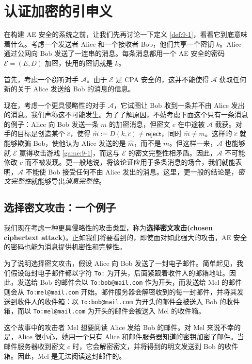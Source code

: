 \section{认证加密的引申义}\label{sec:9-2}

在构建 AE 安全的系统之前，让我们先再讨论一下定义 \ref{def:9-1}，看看它到底意味着什么。考虑一个发送者 Alice 和一个接收者 Bob，他们共享一个密钥 $k$。Alice 通过公网向 Bob 发送了一连串的消息。每条消息都用一个 AE 安全的密码 $\mathcal{E}=(E,D)$ 加密，使用的密钥就是 $k$。

首先，考虑一个窃听对手 $\mathcal{A}$。由于 $\mathcal{E}$ 是 CPA 安全的，这并不能使得 $\mathcal{A}$ 获取任何新的关于 Alice 发送给 Bob 的消息的信息。

现在，考虑一个更具侵略性的对手 $\mathcal{A}$，它试图让 Bob 收到一条并不由 Alice 发出的消息。我们声称这不可能发生。为了了解原因，不妨考虑下面这个只有一条消息的例子：Alice 向 Bob 发送一条 $m$ 的加密消息，但密文 $c$ 在中途被 $\mathcal{A}$ 截获。对手的目标是创造某个 $\hat{c}$，使得 $\hat{m}:=D(k,\hat{c})\neq\mathsf{reject}$，同时 $\hat{m}\neq m$。这样的 $\hat{c}$ 就能够欺骗 Bob，使他认为 Alice 发送的是 $\hat{m}$，而不是 $m$。但这样一来，$\mathcal{A}$ 也能够就 $\mathcal{E}$ 赢得攻击游戏 \ref{game:9-1}，而这与 $\mathcal{E}$ 的密文完整性相矛盾。因此，$\mathcal{A}$ 不可能修改 $c$ 而不被发现。更一般地说，将该论证应用于多条消息的场合，我们就能表明，$\mathcal{A}$ 不能使 Bob 接受任何不由 Alice 发出的消息。这里，更一般的结论是，\emph{密文完整性}就能够导出\emph{消息完整性}。

\subsection{选择密文攻击：一个例子}\label{subsec:9-2-1}

我们现在考虑一种更具侵略性的攻击类型，称为\textbf{选择密文攻击(chosen ciphertext attack)}。正如我们将要看到的，即使面对如此强大的攻击，AE 安全的密码也能为消息提供机密性和完整性。

为了说明选择密文攻击，假设 Alice 向 Bob 发送了一封电子邮件。简单起见，我们假设每封电子邮件都以字符 \texttt{To:} 为开头，后面紧跟着收件人的邮箱地址。因此，发送给 Bob 的邮件会以 \texttt{To:bob@mail.com} 作为开头，而发送给 Mel 的邮件则会从 \texttt{To:mel@mail.com} 开始。邮件服务器会解密收到的每一封邮件，并将其发送到收件人的收件箱：以 \texttt{To:bob@mail.com} 为开头的邮件会被送入 Bob 的收件箱，而以 \texttt{To:mel@mail.com} 为开头的邮件会被送入 Mel 的收件箱。

这个故事中的攻击者 Mel 想要阅读 Alice 发给 Bob 的邮件。对 Mel 来说不幸的是，Alice 很小心，她用一个只有 Alice 和邮件服务器知道的密钥加密了邮件。当邮件服务器收到密文 $c$ 时，它会解密密文，并将得到的明文发送到 Bob 的收件箱。因此，Mel 是无法阅读这封邮件的。

